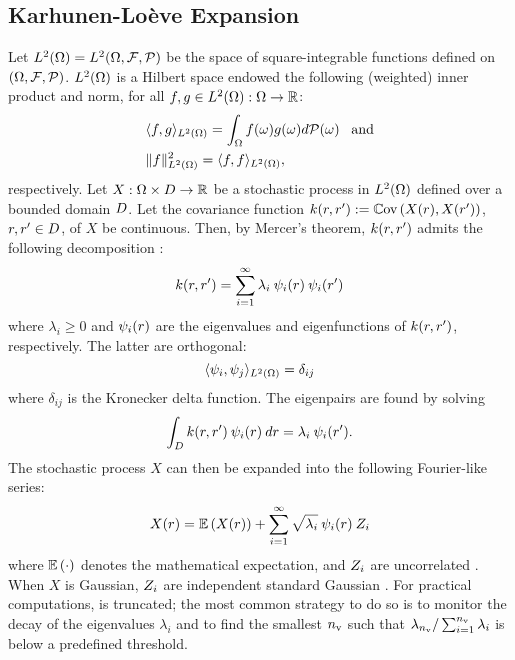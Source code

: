 \subsection{Karhunen-Lo\`{e}ve Expansion} 
Let ${L^{2}(\Omega)} = L^{2}(\Omega, \mathcal{F}, \mathcal{P})$ be the space of square-integrable functions defined on $(\Omega, \mathcal{F}, \mathcal{P})$. ${L^{2}(\Omega)}$ is a Hilbert space endowed the following (weighted) inner product and norm, for all $f, g \in {L^{2}(\Omega)}: \Omega \to \mathbb{R}$:
\begin{align*}
  & \langle f, g \rangle_{L^{2}(\Omega)} = \int_{\Omega} f(\omega) g(\omega) d\mathcal{P}(\omega) \;\;\; \text{and} \\
  & \| f \|^2_{L^{2}(\Omega)} = \langle f, f \rangle_{L^{2}(\Omega)},
\end{align*}
respectively. Let $X: \Omega \times D \to \mathbb{R}$ be a stochastic process in ${L^{2}(\Omega)}$ defined over a bounded domain $D$. Let the covariance function $\fCov{\r, \r'} := \Cov{X(\r), X(\r')}$, $r, r' \in D$, of $X$ be continuous. Then, by Mercer's theorem, $\fCov{\r, \r'}$ admits the following decomposition \cite{maitre2010}:
\[
  \fCov{\r, \r'} = \sum_{i = 1}^\infty \lambda_i \: \klb_i(\r) \: \klb_i(\r')
\]
where $\lambda_i \geq 0$ and $\psi_i(r)$ are the eigenvalues and eigenfunctions of $\fCov{\r, \r'}$, respectively. The latter are orthogonal:
\[
  \langle \psi_i, \psi_j \rangle_{L^{2}(\Omega)} = \delta_{ij}
\]
where $\delta_{ij}$ is the Kronecker delta function. The eigenpairs are found by solving
\begin{equation} \elabel{kl-eigenpairs}
  \int_\domain \fCov{\r, \r'} \: \klb_i (\r) \: \d\r = \lambda_i \: \klb_i(\r').
\end{equation}
The stochastic process $X$ can then be expanded into the following Fourier-like series:
\begin{equation} \elabel{kl-expansion}
  X(\r) = \E{X(\r)} + \sum_{i = 1}^\infty \sqrt{\lambda_i} \: \klb_i(\r) \: \Z_i
\end{equation}
where $\mathbb{E}\left( \cdot \right)$ denotes the mathematical expectation, and $Z_i$ are uncorrelated \rvs. When $X$ is Gaussian, $Z_i$ are independent standard Gaussian \rvs. For practical computations,  is truncated; the most common strategy to do so is to monitor the decay of the eigenvalues $\lambda_i$ and to find the smallest ${n_\text{v}}$ such that $\lambda_{n_\text{v}} / \sum_{i = 1}^{n_\text{v}} \lambda_i$ is below a predefined threshold.

